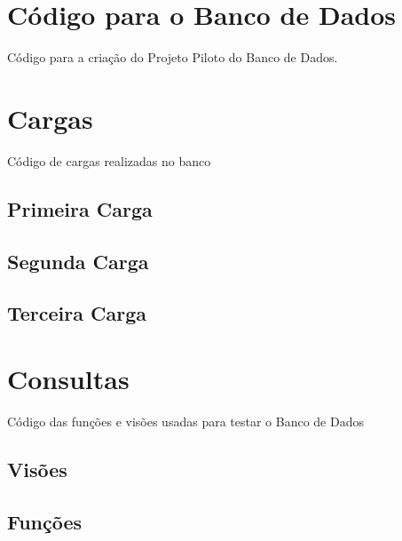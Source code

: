 \label{ap1}
\section{Código para o Banco de Dados}\label{cdg}

Código para a criação do Projeto Piloto do Banco de Dados.


\section{Cargas}\label{crg}
Código de cargas realizadas no banco
\subsection{Primeira Carga} \label{carga1}

\subsection{Segunda Carga}\label{carga2}

\subsection{Terceira Carga}\label{carga3}


\section{Consultas}\label{con}
Código das funções e visões usadas para testar o Banco de Dados
\subsection{Visões}\label{visoes}

\subsection{Funções}\label{funcoes}


